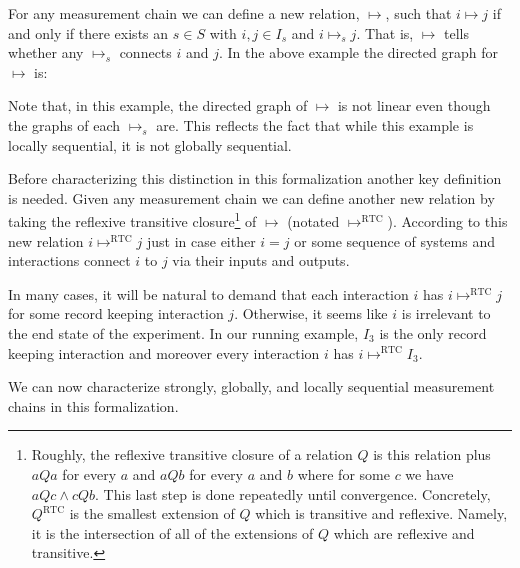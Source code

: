 \documentclass[prd,twocolumn,superscriptaddress,floatfix,amsmath,amssymb,amsfonts,nofootinbib]{revtex4-2}
\begin{document}
For any measurement chain we can define a new relation, $\mapsto$, such that $i\mapsto j$ if and only if there exists an $s\in S$ with $i,j\in I_s$ and $i \mapsto_s j$. That is, $\mapsto$ tells whether any $\mapsto_s$ connects $i$ and $j$. In the above example the directed graph for $\mapsto$ is:\\
\begin{center}
\end{center}
Note that, in this example, the directed graph of $\mapsto$ is not linear even though the graphs of each $\mapsto_s$ are. This reflects the fact that while this example is locally sequential, it is not globally sequential. 

Before characterizing this distinction in this formalization another key definition is needed. Given any measurement chain we can define another new relation by taking the reflexive transitive closure\footnote{Roughly, the reflexive transitive closure of a relation $Q$ is this relation plus $aQa$ for every $a$ and $aQb$ for every $a$ and $b$ where for some $c$ we have $aQc\land cQb$. This last step is done repeatedly until convergence. Concretely, $Q^\text{RTC}$ is the smallest extension of $Q$ which is transitive and reflexive. Namely, it is the intersection of all of the extensions of $Q$ which are reflexive and transitive.} of $\mapsto$ (notated $\mapsto^\text{RTC}$). According to this new relation $i\mapsto^\text{RTC}j$ just in case either $i=j$ or some sequence of systems and interactions connect $i$ to $j$ via their inputs and outputs. 

In many cases, it will be natural to demand that each interaction $i$ has $i\mapsto^\text{RTC} j$ for some record keeping interaction $j$. Otherwise, it seems like $i$ is irrelevant to the end state of the experiment. In our running example, $I_3$ is the only record keeping interaction and moreover every interaction $i$ has $i\mapsto^\text{RTC} I_3$.

We can now characterize strongly, globally, and locally sequential measurement chains in this formalization. 
\end{document}
